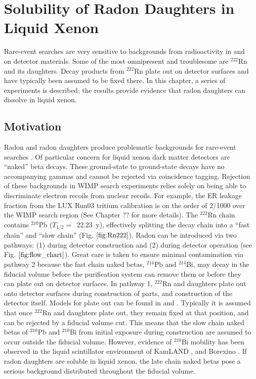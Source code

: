 \chapter{Solubility of Radon Daughters in Liquid Xenon}\label{ch:radon} %
Rare-event searches are very sensitive to backgrounds from radioactivity in and on detector materials. Some of the most omnipresent and troublesome are $^{222}$Rn and its daughters. Decay products from $^{222}$Rn plate out on detector surfaces and have typically been assumed to be fixed there. In this chapter, a series of experiments is described; the results provide evidence that radon daughters can dissolve in liquid xenon.

\section{Motivation}
Radon and radon daughters produce problematic backgrounds for rare-event searches \cite{Akerib:2014rda}. Of particular concern for liquid xenon dark matter detectors are ``naked'' beta decays. These ground-state to ground-state decays have no accompanying gammas and cannot be rejected via coincidence tagging. Rejection of these backgrounds in WIMP search experiments relies solely on being able to discriminate electron recoils from nuclear recoils. For example, the \ac{ER} leakage fraction from the LUX Run03 tritium calibration is on the order of 2/1000 over the WIMP search region \cite{LUX:Tritium} (See Chapter ?? for more details).  The $^{222}$Rn chain contains $^{210}$Pb ($T_{1/2} = $~22.23~y), effectively splitting the decay chain into a ``fast chain'' and ``slow chain'' (Fig. $\ref{fig:Rn222}$). Radon can be introduced via two pathways: (1) during detector construction and (2) during detector operation (see Fig. $\ref{fig:flow_chart}$). Great care is taken to ensure minimal contamination via pathway 2 because the fast chain naked betas, $^{214}$Pb and $^{214}$Bi, may decay in the fiducial volume before the purification system can remove them or before they can plate out on detector surfaces. In pathway 1, $^{222}$Rn and daughters plate out onto detector surfaces during construction of parts, and construction of the detector itself. Models for plate out can be found in \cite{Guiseppe:2011mj} and \cite{Knutson:1988}. Typically it is assumed that once $^{222}$Rn and daughters plate out, they remain fixed at that position, and can be rejected by a fiducial volume cut. This means that the slow chain naked betas of $^{210}$Pb and $^{210}$Bi from initial exposure during construction are assumed to occur outside the fiducial volume. However, evidence of $^{210}$Bi mobility has been observed in the liquid scintillator environment of KamLAND  \cite{Takemoto:2015gta}, \cite{Gando:2014wjd} and Borexino \cite{Bellini:2013lnn}. If radon daughters are soluble in liquid xenon, the late chain naked betas pose a serious background distributed throughout the fiducial volume.


